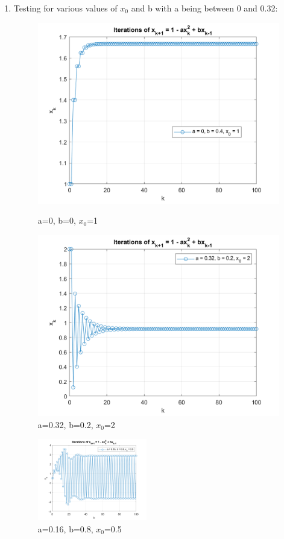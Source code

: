 \documentclass{article}
\begin{document}
\begin{enumerate} [label=\Alph*]
  \newpage
  \item Testing for various values of $x_0$ and b with a being between 0 and 0.32:
  \begin{figure}[h]
    \centering
    \begin{minipage}[t]{0.5\textwidth}
      \centering
      \includegraphics[width=0.8\linewidth]{Problem3_B_1.png}
      \caption{a=0, b=0, $x_0$=1} 
      \label{fig:img1}
    \end{minipage}%
    \begin{minipage}[t]{0.5\textwidth}
      \centering
      \includegraphics[width=0.8\linewidth]{Problem3_B_2.png}
      \caption{a=0.32, b=0.2, $x_0$=2}
      \label{fig:img2}
    \end{minipage}
  \end{figure}
  \begin{figure}[H]
    \centering
    \includegraphics[width=0.45\textwidth]{Problem3_B_3.png}
    \caption{a=0.16, b=0.8, $x_0$=0.5}
    \label{fig:a2}
  \end{figure}


\end{enumerate}
\end{document}
